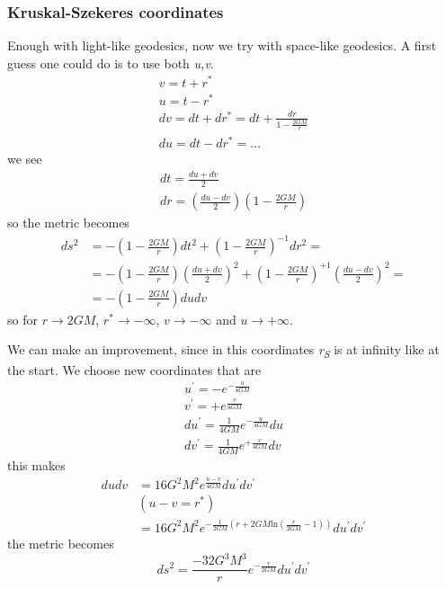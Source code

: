 \subsubsection{Kruskal-Szekeres coordinates}
Enough with light-like geodesics, now we try with space-like geodesics. A first guess one could do is to use both \emph{u,v}. 
\begin{gather*}
v = t + r^{*} \\
u = t - r^{*}\\
dv = dt + dr^{*} = dt + \frac{d r}{ 1 - \frac{2GM}{r}}\\
du = dt - dr^{*} = \ldots 
\end{gather*}
we see 
\begin{gather*}
dt = \frac{du + dv}{2} \\
dr = \left( \frac{du-dv}{2} \right)\left( 1- \frac{2GM}{r} \right)
\end{gather*}
so the metric becomes
\begin{align}
	ds^{2} &= - \left( 1- \frac{2GM}{r} \right)dt^{2} + \left( 1 - \frac{2GM}{r} \right)^{-1} dr^{2} = \\
	       &= - \left( 1 - \frac{2GM}{r}  \right)\left( \frac{du + dv}{2} \right)^{2} + \left( 1 - \frac{2GM}{r} \right) ^{+1} \left( \frac{du - dv}{2} \right)^{2} = \\
	       &= - \left( 1 - \frac{2GM}{r} \right)dudv
\end{align}
so for $r \to  2GM$, $r^{*}\to  -\infty$, $v \to  -\infty$ and $u \to +\infty$.\par
We can make an improvement, since in this coordinates \emph{r\textsubscript{S}} is at infinity like at the start. We choose new coordinates that are
\begin{gather*}
u^{\prime } = -e ^{- \frac{u}{4GM}} \\
v^{\prime } = + e ^{\frac{v}{4GM}}\\
du^{\prime } = \frac{1}{4GM} e^{-\frac{u}{4GM}}du\\
dv^{\prime } = \frac{1}{4GM} e^{+\frac{v}{4GM}}dv
\end{gather*}
this makes
\begin{align}
	dudv &= 16G^{2}M^{2} e^{ \frac{u-v}{4GM}} du^{\prime }dv^{\prime }\\
	     &\left( u -v = r^{*} \right) \\
	     &=16G^{2}M^{2} e^{ -\frac{1}{2GM} \left( r + 2GM \text{ln}\left( \frac{r}{2GM} -1 \right)	 \right)} du^{\prime }dv^{\prime }
\end{align}
the metric becomes
\begin{equation}
ds^{2} = \frac{-32G^{3}M^{3}}{r} e ^{ -\frac{r}{2GM}} du^{\prime }dv^{\prime }
\end{equation}
